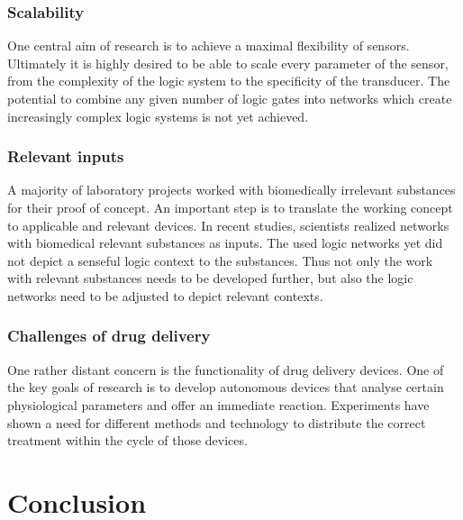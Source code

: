 \documentclass[runningheads]{llncs}
\begin{document}
\subsubsection{Scalability}	One central aim of research is to achieve a maximal flexibility of sensors. Ultimately it is highly desired to be able to scale every parameter of the sensor, from the complexity of the logic system to the specificity of the transducer. The potential to combine any given number of logic gates into networks which create increasingly complex logic systems is not yet achieved.\cite{original}

\subsubsection{Relevant inputs}	A majority of laboratory projects worked with biomedically irrelevant substances for their proof of concept. An important step is to translate the working concept to applicable and relevant devices. In recent studies, scientists realized networks with biomedical relevant substances as inputs. The used logic networks yet did not depict a senseful logic context to the substances. Thus not only the work with relevant substances needs to be developed further, but also the logic networks need to be adjusted to depict relevant contexts.\cite{original}

\subsubsection{Challenges of drug delivery}	One rather distant concern is the functionality of drug delivery devices. One of the key goals of research is to develop autonomous devices that analyse certain physiological parameters and offer an immediate reaction. Experiments have shown a need for different methods and technology to distribute the correct treatment within the cycle of those devices. \cite{original}


\section{Conclusion}
\end{document}

